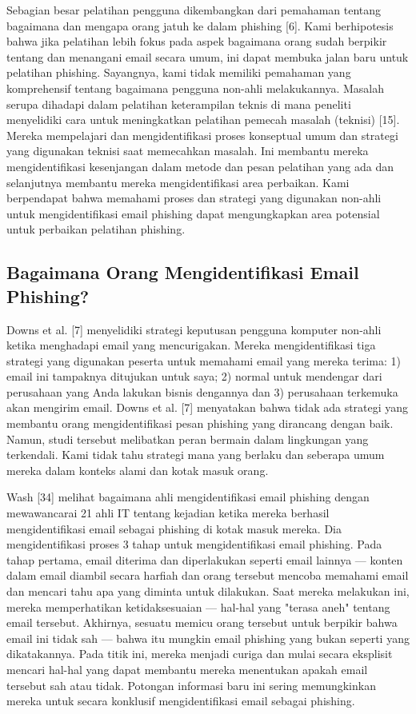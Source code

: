 \documentclass[lettersize,journal]{IEEEtran}
\begin{document}
Sebagian besar pelatihan pengguna dikembangkan dari pemahaman tentang bagaimana dan mengapa orang jatuh ke dalam phishing [6]. Kami berhipotesis bahwa jika pelatihan lebih fokus pada aspek bagaimana orang sudah berpikir tentang dan menangani email secara umum, ini dapat membuka jalan baru untuk pelatihan phishing. Sayangnya, kami tidak memiliki pemahaman yang komprehensif tentang bagaimana pengguna non-ahli melakukannya. Masalah serupa dihadapi dalam pelatihan keterampilan teknis di mana peneliti menyelidiki cara untuk meningkatkan pelatihan pemecah masalah (teknisi) [15]. Mereka mempelajari dan mengidentifikasi proses konseptual umum dan strategi yang digunakan teknisi saat memecahkan masalah. Ini membantu mereka mengidentifikasi kesenjangan dalam metode dan pesan pelatihan yang ada dan selanjutnya membantu mereka mengidentifikasi area perbaikan. Kami berpendapat bahwa memahami proses dan strategi yang digunakan non-ahli untuk mengidentifikasi email phishing dapat mengungkapkan area potensial untuk perbaikan pelatihan phishing.

\subsection{Bagaimana Orang Mengidentifikasi Email Phishing?}

Downs et al. [7] menyelidiki strategi keputusan pengguna komputer non-ahli ketika menghadapi email yang mencurigakan. Mereka mengidentifikasi tiga strategi yang digunakan peserta untuk memahami email yang mereka terima: 1) email ini tampaknya ditujukan untuk saya; 2) normal untuk mendengar dari perusahaan yang Anda lakukan bisnis dengannya dan 3) perusahaan terkemuka akan mengirim email. Downs et al. [7] menyatakan bahwa tidak ada strategi yang membantu orang mengidentifikasi pesan phishing yang dirancang dengan baik. Namun, studi tersebut melibatkan peran bermain dalam lingkungan yang terkendali. Kami tidak tahu strategi mana yang berlaku dan seberapa umum mereka dalam konteks alami dan kotak masuk orang.

Wash [34] melihat bagaimana ahli mengidentifikasi email phishing dengan mewawancarai 21 ahli IT tentang kejadian ketika mereka berhasil mengidentifikasi email sebagai phishing di kotak masuk mereka. Dia mengidentifikasi proses 3 tahap untuk mengidentifikasi email phishing. Pada tahap pertama, email diterima dan diperlakukan seperti email lainnya — konten dalam email diambil secara harfiah dan orang tersebut mencoba memahami email dan mencari tahu apa yang diminta untuk dilakukan. Saat mereka melakukan ini, mereka memperhatikan ketidaksesuaian — hal-hal yang "terasa aneh" tentang email tersebut. Akhirnya, sesuatu memicu orang tersebut untuk berpikir bahwa email ini tidak sah — bahwa itu mungkin email phishing yang bukan seperti yang dikatakannya. Pada titik ini, mereka menjadi curiga dan mulai secara eksplisit mencari hal-hal yang dapat membantu mereka menentukan apakah email tersebut sah atau tidak. Potongan informasi baru ini sering memungkinkan mereka untuk secara konklusif mengidentifikasi email sebagai phishing.
\end{document}

